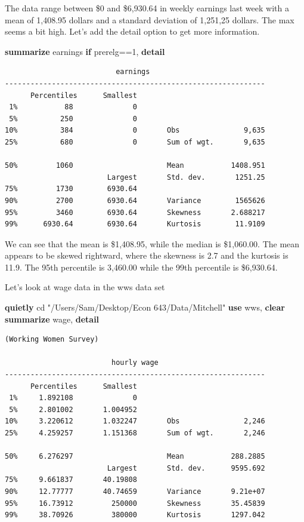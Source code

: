 \documentclass[
]{book}
\newenvironment{Shaded}{\begin{snugshade}}{\end{snugshade}}
\newcommand{\KeywordTok}[1]{\textcolor[rgb]{0.13,0.29,0.53}{\textbf{#1}}}
\newcommand{\NormalTok}[1]{#1}
\newcommand{\StringTok}[1]{\textcolor[rgb]{0.31,0.60,0.02}{#1}}
\begin{document}
The data range between \$0 and \$6,930.64 in weekly earnings last week with a mean of 1,408.95 dollars and a standard deviation of 1,251,25 dollars. The max seems
a bit high. Let's add the detail option to get more information.

\begin{Shaded}
\begin{Highlighting}[]
\KeywordTok{summarize}\NormalTok{ earnings }\KeywordTok{if}\NormalTok{ prerelg==1, }\KeywordTok{detail}
\end{Highlighting}
\end{Shaded}

\begin{verbatim}
                          earnings
-------------------------------------------------------------
      Percentiles      Smallest
 1%           88              0
 5%          250              0
10%          384              0       Obs               9,635
25%          680              0       Sum of wgt.       9,635

50%         1060                      Mean           1408.951
                        Largest       Std. dev.       1251.25
75%         1730        6930.64
90%         2700        6930.64       Variance        1565626
95%         3460        6930.64       Skewness       2.688217
99%      6930.64        6930.64       Kurtosis        11.9109
\end{verbatim}

We can see that the mean is \$1,408.95, while the median is \$1,060.00. The mean appears to be skewed rightward, where the skewness is 2.7 and the kurtosis is 11.9. The 95th percentile is 3,460.00 while the 99th percentile is \$6,930.64.

Let's look at wage data in the wws data set

\begin{Shaded}
\begin{Highlighting}[]
\KeywordTok{quietly}\NormalTok{ cd }\StringTok{"/Users/Sam/Desktop/Econ 643/Data/Mitchell"}
\KeywordTok{use}\NormalTok{ wws, }\KeywordTok{clear}
\KeywordTok{summarize}\NormalTok{ wage, }\KeywordTok{detail}
\end{Highlighting}
\end{Shaded}

\begin{verbatim}
(Working Women Survey)

                         hourly wage
-------------------------------------------------------------
      Percentiles      Smallest
 1%     1.892108              0
 5%     2.801002       1.004952
10%     3.220612       1.032247       Obs               2,246
25%     4.259257       1.151368       Sum of wgt.       2,246

50%     6.276297                      Mean           288.2885
                        Largest       Std. dev.      9595.692
75%     9.661837       40.19808
90%     12.77777       40.74659       Variance       9.21e+07
95%     16.73912         250000       Skewness       35.45839
99%     38.70926         380000       Kurtosis       1297.042
\end{verbatim}
\end{document}

